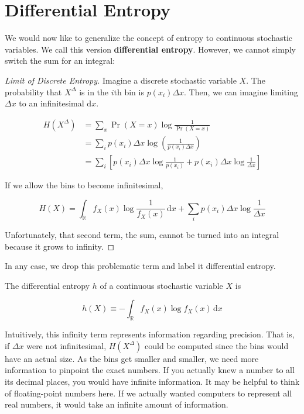 \documentclass[13pt,oneside]{tufte-book}
\theoremstyle{definition}
\theoremstyle{definition}
\theoremstyle{definition}
\theoremstyle{remark}
\let\BeginKnitrBlock\begin \let\EndKnitrBlock\end
\begin{document}
\section{Differential Entropy}\label{differential-entropy}

We would now like to generalize the concept of entropy to continuous
stochastic variables. We call this version \textbf{differential
entropy}. However, we cannot simply switch the sum for an integral:

\BeginKnitrBlock{proof}[Limit of Discrete Entropy]
{} Imagine a
discrete stochastic variable \(X\). The probability that \(X^\Delta\) is
in the \(i\)th bin is \(p(x_i)\Delta x\). Then, we can imagine limiting
\(\Delta x\) to an infinitesimal \(\mathrm{d}x\).

\begin{align*}
H(X^\Delta) &= \sum_x \Pr(X=x) \log \frac{1}{\Pr(X=x)} \\
&= \sum_i p(x_i) \Delta x \log\left( \frac{1}{p(x_i)\Delta x}\right) \\
&= \sum_i \left[ p(x_i)\Delta x \log \frac{1}{p(x_i)} + p(x_i)\Delta x \log \frac{1}{\Delta x} \right]
\end{align*}

If we allow the bins to become infinitesimal,

\[
H(X) = \int_\mathbb{R} f_X(x) \log \frac{1}{f_X(x)}\,\mathrm{d}x + \sum_i p(x_i) \Delta x \log \frac{1}{\Delta x}
\]

Unfortunately, that second term, the sum, cannot be turned into an
integral because it grows to infinity.
\EndKnitrBlock{proof}

In any case, we drop this problematic term and label it differential
entropy.

\BeginKnitrBlock{definition}[Differential Entropy]
\protect\hypertarget{def:unnamed-chunk-57}{}{\label{def:unnamed-chunk-57}
{} }The differential entropy \(h\) of
a continuous stochastic variable \(X\) is

\[
h(X) \equiv -\int_{\mathbb{R}} f_X(x)\log f_X(x) \,\mathrm{d}x
\]
\EndKnitrBlock{definition}

Intuitively, this infinity term represents information regarding
precision. That is, if \(\Delta x\) were not infinitesimal,
\(H(X^\Delta)\) could be computed since the bins would have an actual
size. As the bins get smaller and smaller, we need more information to
pinpoint the exact numbers. If you actually knew a number to all its
decimal places, you would have infinite information. It may be helpful
to think of floating-point numbers here. If we actually wanted computers
to represent all real numbers, it would take an infinite amount of
information.
\end{document}
